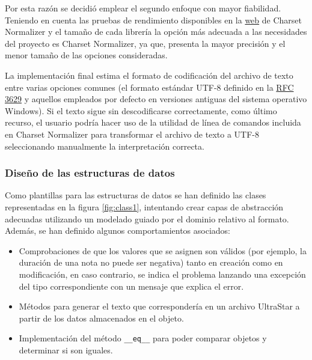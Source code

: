 Por esta razón se decidió emplear el segundo enfoque con mayor fiabilidad. Teniendo en cuenta las pruebas de rendimiento disponibles en la \href{https://github.com/Ousret/charset_normalizer}{web} de Charset Normalizer y el tamaño de cada librería la opción más adecuada a las necesidades del proyecto es Charset Normalizer, ya que, presenta la mayor precisión y el menor tamaño de las opciones consideradas.

La implementación final estima el formato de codificación del archivo de texto entre varias opciones comunes (el formato estándar UTF-8 definido en la \href{https://www.rfc-editor.org/rfc/rfc3629}{RFC 3629} y aquellos empleados por defecto en versiones antiguas del sistema operativo Windows). Si el texto sigue sin descodificarse correctamente, como último recurso, el usuario podría hacer uso de la utilidad de línea de comandos incluida en Charset Normalizer para transformar el archivo de texto a UTF-8 seleccionando manualmente la interpretación correcta.

\subsubsection{Diseño de las estructuras de datos}

Como plantillas para las estructuras de datos se han definido las clases representadas en la figura \ref{fig:class1}, intentando crear capas de abstracción adecuadas utilizando un modelado guiado por el dominio relativo al formato. Además, se han definido algunos comportamientos asociados:
\begin{itemize}
	\item{Comprobaciones de que los valores que se asignen son válidos (por ejemplo, la duración de una nota no puede ser negativa) tanto en creación como en modificación, en caso contrario, se indica el problema lanzando una excepción del tipo correspondiente con un mensaje que explica el error.}
	\item{Métodos para generar el texto que correspondería en un archivo UltraStar a partir de los datos almacenados en el objeto.}
	\item{Implementación del método \texttt{\_\_eq\_\_} para poder comparar objetos  y determinar si son iguales.}
\end{itemize}

